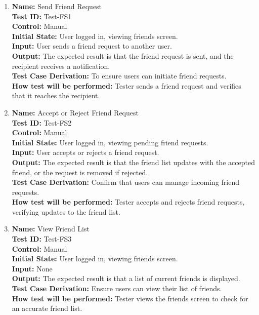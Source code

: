 \documentclass[12pt, titlepage]{article}
\begin{document}
\begin{enumerate}

    \item \textbf{Name:} {Send Friend Request} \label{itm:Test-FS1}\\
    \textbf{Test ID:} Test-FS1\\
    \textbf{Control:} Manual \\
    \textbf{Initial State:} User logged in, viewing friends screen. \\
    \textbf{Input:} User sends a friend request to another user. \\
    \textbf{Output:} The expected result is that the friend request is sent, and the recipient receives a notification. \\
    \textbf{Test Case Derivation:} To ensure users can initiate friend requests. \\
    \textbf{How test will be performed:} Tester sends a friend request and verifies that it reaches the recipient.

    \item \textbf{Name:} {Accept or Reject Friend Request} \label{itm:Test-FS2}\\
    \textbf{Test ID:} Test-FS2\\
    \textbf{Control:} Manual \\
    \textbf{Initial State:} User logged in, viewing pending friend requests. \\
    \textbf{Input:} User accepts or rejects a friend request. \\
    \textbf{Output:} The expected result is that the friend list updates with the accepted friend, or the request is removed if rejected. \\
    \textbf{Test Case Derivation:} Confirm that users can manage incoming friend requests. \\
    \textbf{How test will be performed:} Tester accepts and rejects friend requests, verifying updates to the friend list.

    \item \textbf{Name:} {View Friend List} \label{itm:Test-FS3}\\
    \textbf{Test ID:} Test-FS3\\
    \textbf{Control:} Manual \\
    \textbf{Initial State:} User logged in, viewing friends screen. \\
    \textbf{Input:} None \\
    \textbf{Output:} The expected result is that a list of current friends is displayed. \\
    \textbf{Test Case Derivation:} Ensure users can view their list of friends. \\
    \textbf{How test will be performed:} Tester views the friends screen to check for an accurate friend list.


\end{enumerate}
\end{document}
